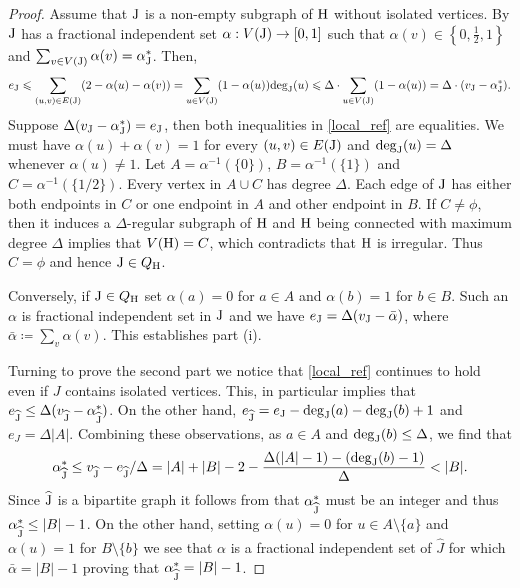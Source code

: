 \documentclass[a4paper,11pt,english,reqno]{amsart}
\numberwithin{equation}{section}
\renewcommand{\leq}{\leqslant}
\newcommand{\uH}{\textup{H}}
\newcommand{\tu}[1]{\textup{#1}}
\begin{document}
		\begin{proof}%
			Assume that $\tu{J}$ is a non-empty subgraph of $\uH$ without isolated vertices. By \cite[Lemma~5.2]{HMS} $\tu{J}$ has a fractional independent set $\alpha:V(\tu{J})\rightarrow [0,1]$ such that $\alpha(v)\in \left\{0,\frac{1}{2}, 1\right\}$ and $\sum_{v\in V(\tu{J})}\alpha(v) = \alpha^{*}_{\tu{J}}$. Then,
			\begin{equation}
				\label{local_ref}
				e_{\tu{J}} \leq \sum_{(u,v) \in E(\tu{J})}(2-\alpha(u)-\alpha(v)) =\sum_{u\in V(\tu{J})}(1-\alpha(u))\text{deg}_{\tu{J}}(u)\leq \Delta\cdot \sum_{u\in V(\tu{J})}(1-\alpha(u)) = \Delta\cdot(v_{\tu{J}}-\alpha^{*}_{\tu{J}}).
			\end{equation}
			Suppose $\Delta(v_{\tu{J}}-\alpha^{*}_{\tu{J}})= e_{\tu{J}}$, then both inequalities in \eqref{local_ref} are equalities. We must have $\alpha(u)+\alpha(v) = 1$ for every $(u,v) \in E(\tu{J})$ and $\text{deg}_{\tu{J}}(u) = \Delta$ whenever $\alpha(u)\neq 1$. Let $A = \alpha^{-1}(\{0\})$, $B = \alpha^{-1}(\{1\})$ and $C = \alpha^{-1}(\{1/2\})$. Every vertex in $A\cup C$ has degree $\Delta$. Each edge of $\tu{J}$ has either both endpoints in $C$ or one endpoint in $A$ and other endpoint in $B$. If $C \neq \phi$, then it induces a $\Delta$-regular subgraph of $\uH$ and $\uH$ being connected with maximum degree $\Delta$ implies that $V(\uH)=C$, which contradicts that $\uH$ is irregular. Thus $C=\phi$ and hence %
			$\tu{J}\in Q_{\uH}$.
			
			Conversely, if $\tu{J} \in Q_{\uH}$ set %
			$\alpha(a) = 0$ for $a\in A$ and $\alpha(b) = 1$ for $b\in B$. Such an $\alpha$ is fractional independent set in $\tu{J}$ and we have $e_{\tu{J}}= \Delta (v_{\tu{J}} - \bar\alpha)$, where $\bar \alpha \coloneqq \sum_{v} \alpha(v)$. This establishes part (i).
			
			Turning to prove the second part we notice that \eqref{local_ref} continues to hold even if $J$ contains isolated vertices. This, in particular implies that $e_{\widehat{\tu{J}}} \le \Delta (v_{\widehat{\tu{J}}} - \alpha^*_{\widehat{\tu{J}}})$. On the other hand, $e_{\widehat{\tu{J}}} = e_{\tu{J}} - \deg_{\tu{J}}(a) - \deg_{\tu{J}}(b) +1$ and $e_J = \Delta |A|$. Combining these observations, as $a \in A$ and $\deg_{\tu{J}}(b) \le \Delta$, we find that 
			\begin{equation*}
				\alpha^*_{\widehat{\tu{J}}} \le v_{\widehat{\tu{J}}} - e_{\widehat{\tu{J}}}/\Delta = |A|+|B| -2 - \frac{\Delta(|A|-1) - (\deg_{\tu{J}}(b) -1)}{\Delta} < |B|.
			\end{equation*}
			Since $\widehat{\tu{J}}$ is a bipartite graph it follows from \cite[Proposition A.3]{JOR} that $\alpha^*_{\widehat{\tu{J}}}$ must be an integer and thus $\alpha^*_{\widehat{\tu{J}}} \le |B|-1$. On the other hand, setting $\alpha(u)=0$ for $u \in A\setminus \{a\}$ and $\alpha(u)=1$ for $B \setminus \{b\}$ we see that $\alpha$ is a fractional independent set of $\widehat{J}$ for which $\bar \alpha = |B|-1$ proving that $\alpha^*_{\widehat{\tu{J}}}=|B|-1$.
		\end{proof}
	
\end{document}
